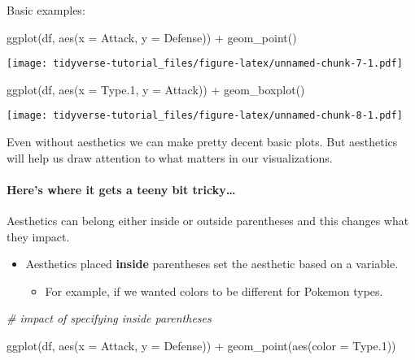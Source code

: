 \documentclass[
]{article}
\newenvironment{Shaded}{\begin{snugshade}}{\end{snugshade}}
\newcommand{\AttributeTok}[1]{\textcolor[rgb]{0.77,0.63,0.00}{#1}}
\newcommand{\CommentTok}[1]{\textcolor[rgb]{0.56,0.35,0.01}{\textit{#1}}}
\newcommand{\FloatTok}[1]{\textcolor[rgb]{0.00,0.00,0.81}{#1}}
\newcommand{\FunctionTok}[1]{\textcolor[rgb]{0.00,0.00,0.00}{#1}}
\newcommand{\NormalTok}[1]{#1}
\newcommand{\SpecialCharTok}[1]{\textcolor[rgb]{0.00,0.00,0.00}{#1}}
\providecommand{\tightlist}{%
  \setlength{\itemsep}{0pt}\setlength{\parskip}{0pt}}
\begin{document}
Basic examples:

\begin{Shaded}
\begin{Highlighting}[]
\FunctionTok{ggplot}\NormalTok{(df, }\FunctionTok{aes}\NormalTok{(}\AttributeTok{x =}\NormalTok{ Attack, }\AttributeTok{y =}\NormalTok{ Defense)) }\SpecialCharTok{+}
  \FunctionTok{geom\_point}\NormalTok{()}
\end{Highlighting}
\end{Shaded}

\texttt{[image: tidyverse-tutorial\_files/figure-latex/unnamed-chunk-7-1.pdf]}

\begin{Shaded}
\begin{Highlighting}[]
\FunctionTok{ggplot}\NormalTok{(df, }\FunctionTok{aes}\NormalTok{(}\AttributeTok{x =}\NormalTok{ Type}\FloatTok{.1}\NormalTok{, }\AttributeTok{y =}\NormalTok{ Attack)) }\SpecialCharTok{+}
  \FunctionTok{geom\_boxplot}\NormalTok{()}
\end{Highlighting}
\end{Shaded}

\texttt{[image: tidyverse-tutorial\_files/figure-latex/unnamed-chunk-8-1.pdf]}

Even without aesthetics we can make pretty decent basic plots. But
aesthetics will help us draw attention to what matters in our
visualizations.

\hypertarget{heres-where-it-gets-a-teeny-bit-tricky}{%
\paragraph{Here's where it gets a teeny bit
tricky\ldots{}}\label{heres-where-it-gets-a-teeny-bit-tricky}}

Aesthetics can belong either inside or outside parentheses and this
changes what they impact.

\begin{itemize}
\item
  Aesthetics placed \textbf{inside} parentheses set the aesthetic based
  on a variable.

  \begin{itemize}
  \tightlist
  \item
    For example, if we wanted colors to be different for Pokemon types.
  \end{itemize}
\end{itemize}

\begin{Shaded}
\begin{Highlighting}[]
\CommentTok{\# impact of specifying inside parentheses}

\FunctionTok{ggplot}\NormalTok{(df, }\FunctionTok{aes}\NormalTok{(}\AttributeTok{x =}\NormalTok{ Attack, }\AttributeTok{y =}\NormalTok{ Defense)) }\SpecialCharTok{+}
  \FunctionTok{geom\_point}\NormalTok{(}\FunctionTok{aes}\NormalTok{(}\AttributeTok{color =}\NormalTok{ Type}\FloatTok{.1}\NormalTok{))}
\end{Highlighting}
\end{Shaded}
\end{document}
